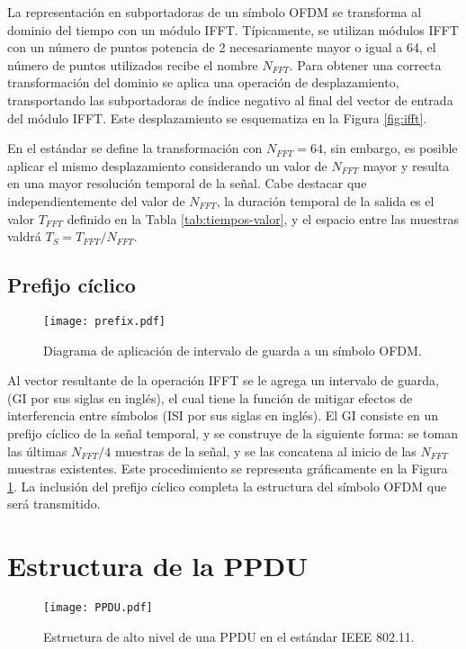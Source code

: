 La representación en subportadoras de un símbolo OFDM se transforma al dominio del tiempo con un módulo IFFT. Típicamente, se utilizan módulos IFFT con un número de puntos potencia de 2 necesariamente mayor o igual a 64, el número de puntos utilizados recibe el nombre $N_{FFT}$. Para obtener una correcta transformación del dominio se aplica una operación de desplazamiento, transportando las subportadoras de índice negativo al final del vector de entrada del módulo IFFT. Este desplazamiento se esquematiza en la Figura \ref{fig:ifft}.

En el estándar se define la transformación con $N_{FFT}=64$, sin embargo, \color{Green} es posible aplicar el mismo desplazamiento considerando un valor de $N_{FFT}$ mayor \color{black} y resulta en una mayor resolución temporal de la señal. Cabe destacar que independientemente del valor de $N_{FFT}$, la duración temporal de la salida es el valor $T_{FFT}$ definido en la Tabla \ref{tab:tiempos-valor}, y el espacio entre las muestras valdrá $T_S = T_{FFT}/N_{FFT}$.

\subsection{Prefijo cíclico}
\label{Ss:ch2-prefijo}
\begin{figure}[t]
    \centering{}\texttt{[image: prefix.pdf]}
    \caption{Diagrama de aplicación de intervalo de guarda a un símbolo OFDM.\label{fig:prefijo}}  
\end{figure}


Al vector resultante de la operación IFFT se le agrega un intervalo de guarda, (GI por sus siglas en inglés), el cual tiene la función de mitigar efectos de interferencia entre símbolos (ISI por sus siglas en inglés). El GI consiste en un prefijo cíclico de la señal temporal, y se construye de la siguiente forma: se toman las últimas $N_{FFT}/4$ muestras de la señal, y se las concatena al inicio de las $N_{FFT}$ muestras existentes. Este procedimiento se representa gráficamente en la Figura \ref{fig:prefijo}. La inclusión del prefijo cíclico completa la estructura del símbolo OFDM que será transmitido.


\section{Estructura de la PPDU}
\label{S:ch2-ppdu}

\begin{figure}[t]
    \centering{}\texttt{[image: PPDU.pdf]}
    \caption{Estructura de alto nivel de una PPDU en el estándar IEEE 802.11.\label{fig:ppdu}}  
\end{figure}

